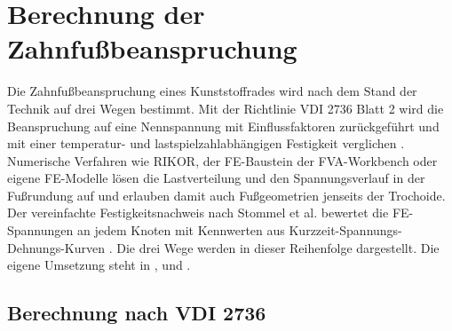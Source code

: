 \section{Berechnung der Zahnfußbeanspruchung}
\label{sec:berechnung_stand}

Die Zahnfußbeanspruchung eines Kunststoffrades wird nach dem Stand der Technik auf drei Wegen bestimmt. Mit der Richtlinie VDI 2736 Blatt 2 wird die Beanspruchung auf eine Nennspannung mit Einflussfaktoren zurückgeführt und mit einer temperatur- und lastspielzahlabhängigen Festigkeit verglichen \cite[S.~11 bis 15]{VDI2736-2}. Numerische Verfahren wie RIKOR, der FE-Baustein der FVA-Workbench oder eigene FE-Modelle lösen die Lastverteilung und den Spannungsverlauf in der Fußrundung auf und erlauben damit auch Fußgeometrien jenseits der Trochoide. Der vereinfachte Festigkeitsnachweis nach Stommel et al. bewertet die FE-Spannungen an jedem Knoten mit Kennwerten aus Kurzzeit-Spannungs-Dehnungs-Kurven \cite[Kap.~6]{Sto18}. Die drei Wege werden in dieser Reihenfolge dargestellt. Die eigene Umsetzung steht in ,  und .

\subsection{Berechnung nach VDI 2736}
\label{sec:vdi2736}


